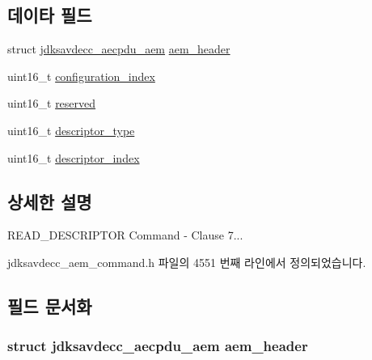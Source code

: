 \subsection*{데이타 필드}
\begin{DoxyCompactItemize}
\item 
struct \hyperlink{structjdksavdecc__aecpdu__aem}{jdksavdecc\+\_\+aecpdu\+\_\+aem} \hyperlink{structjdksavdecc__aem__command__read__descriptor_ae1e77ccb75ff5021ad923221eab38294}{aem\+\_\+header}
\item 
uint16\+\_\+t \hyperlink{structjdksavdecc__aem__command__read__descriptor_afaad1bd7c66f9611e134d8c5ce98f444}{configuration\+\_\+index}
\item 
uint16\+\_\+t \hyperlink{structjdksavdecc__aem__command__read__descriptor_a5a6ed8c04a3db86066924b1a1bf4dad3}{reserved}
\item 
uint16\+\_\+t \hyperlink{structjdksavdecc__aem__command__read__descriptor_ab7c32b6c7131c13d4ea3b7ee2f09b78d}{descriptor\+\_\+type}
\item 
uint16\+\_\+t \hyperlink{structjdksavdecc__aem__command__read__descriptor_a042bbc76d835b82d27c1932431ee38d4}{descriptor\+\_\+index}
\end{DoxyCompactItemize}


\subsection{상세한 설명}
R\+E\+A\+D\+\_\+\+D\+E\+S\+C\+R\+I\+P\+T\+OR Command -\/ Clause 7... 

jdksavdecc\+\_\+aem\+\_\+command.\+h 파일의 4551 번째 라인에서 정의되었습니다.



\subsection{필드 문서화}
\subsubsection[{\texorpdfstring{aem\+\_\+header}{aem_header}}]{\setlength{\rightskip}{0pt plus 5cm}struct {\bf jdksavdecc\+\_\+aecpdu\+\_\+aem} aem\+\_\+header}\hypertarget{structjdksavdecc__aem__command__read__descriptor_ae1e77ccb75ff5021ad923221eab38294}{}\label{structjdksavdecc__aem__command__read__descriptor_ae1e77ccb75ff5021ad923221eab38294}


